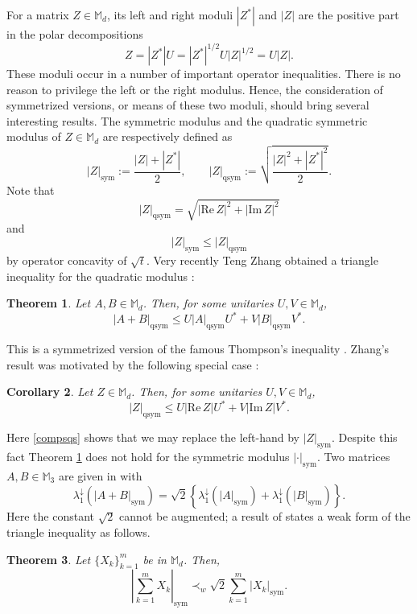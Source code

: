 \documentclass[12pt,reqno]{article}
\newtheorem{theorem}{Theorem}[section]
\newtheorem{cor}[theorem]{Corollary}
\theoremstyle{definition}
\theoremstyle{remark}
\numberwithin{equation}{section}
\def\bM{\mathbb{M}}
\newcommand{\sym}{\mathrm{sym}}
\newcommand{\qsym}{\mathrm{qsym}}
\begin{document}
For a matrix $Z\in\bM_d$, its left and right moduli $|Z^*|$ and $|Z|$ are the positive part in the polar decompositions
$$
Z=|Z^*|U=|Z^*|^{1/2}U|Z|^{1/2}=U|Z|.
$$
These moduli occur in a number of important operator inequalities. There is no reason to privilege the left or the right modulus. Hence, the consideration of symmetrized versions, or means of these two moduli, should bring several interesting results. 
The symmetric modulus and the quadratic symmetric modulus of $Z\in\bM_d$ are respectively defined as
$$
|Z|_{\sym}:= \frac{|Z|+|Z^*|}{2}, \qquad
|Z|_{\qsym}:=\sqrt{\frac{|Z|^2+|Z^*|^2}{2}}.
$$
Note that $$|Z|_{\qsym}=\sqrt{|{\mathrm{Re\,}}Z|^2+ |{\mathrm{Im\,}}Z|^2}$$
and
 \begin{equation}\label{compsqs}
|Z|_{\sym}\le |Z|_{\qsym}
\end{equation} 
by operator concavity of $\sqrt{t}$. Very recently Teng Zhang obtained a    triangle  inequality for the quadratic modulus \cite[Theorem 1.9]{TZsym}:



\vskip 5pt\noindent
\begin{theorem}\label{thZ}  Let $A,B\in\bM_d$. Then, for some unitaries $U,V\in\bM_d$,
$$
|A+B|_{\qsym} \le U|A|_{\qsym}U^* +V|B|_{\qsym}V^*.
$$
\end{theorem}

\vskip 5pt
This  is a symmetrized version of the famous Thompson's inequality \cite{T}.  Zhang's result
    was motivated by  the following  special case   \cite{BLsym}:


\vskip 5pt
\begin{cor}\label{symq} Let $Z\in\bM_d$. Then, for some unitaries $U,V\in\bM_d$,
$$
 |Z|_{\qsym} \le U |{\mathrm{Re\,}}Z| U^* + V |{\mathrm{Im\,}}Z|V^*.
$$
\end{cor}


Here \eqref{compsqs} shows that we may replace the left-hand by $|Z|_{\sym}$. 
Despite  this fact  Theorem \ref{thZ} does not hold for  the symmetric modulus $|\cdot|_{\sym}$.   Two matrices $A,B\in\bM_3$ are given in \cite{Z2} with $$\lambda_1^{\downarrow}(|A+B|_{\sym})=\sqrt{2} \left\{ \lambda_1^{\downarrow}(|A|_{\sym})+\lambda_1^{\downarrow}( |B|_{\sym})\right\}.$$ Here the constant $\sqrt{2}$ cannot be augmented;  a result of \cite{BLtriang} states a weak form of the triangle inequality as follows.


\vskip 5pt
\begin{theorem}\label{cornor}   Let $\{X_k\}_{k=1}^m$ be in $\bM_d$. Then, 
$$
\left|\sum_{k=1}^m X_k\right|_{\sym} \prec_w \sqrt{2} \sum_{k=1}^m \left|X_k\right|_{\sym}.
$$
\end{theorem}
\end{document}
